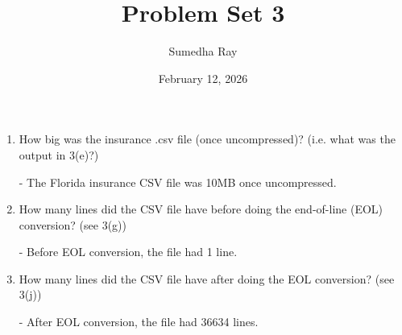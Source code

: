 \documentclass{article}
\title{Problem Set 3}
\author{Sumedha Ray}
\date{February 12, 2026}
\begin{document}
\maketitle

\begin{enumerate}
    \item How big was the insurance .csv file (once uncompressed)? (i.e. what was the output in 3(e)?)
    
    - The Florida insurance CSV file was 10MB once uncompressed.
    \item How many lines did the CSV file have before doing the end-of-line (EOL) conversion? (see 3(g))
    
    - Before EOL conversion, the file had 1 line.
    \item How many lines did the CSV file have after doing the EOL conversion? (see 3(j))
    
    - After EOL conversion, the file had 36634 lines.
\end{enumerate}
\end{document}
